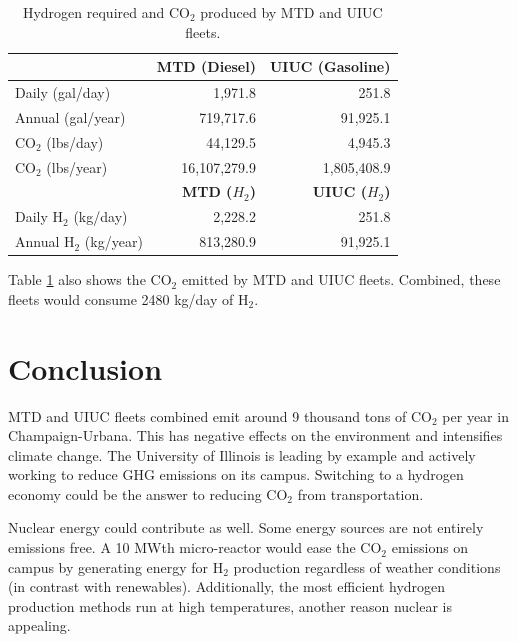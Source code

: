\documentclass{anstrans}
\begin{document}
\begin{table}[H]
	\centering
    \caption{Hydrogen required and CO$_2$ produced by \gls{MTD} and \gls{UIUC} fleets.}
    \label{tab:h2req}
\begin{tabular}{l|rr}
\hline
                   & \textbf{MTD (Diesel)}   & \textbf{UIUC (Gasoline)}  \\ \hline
                   Daily (gal/day)    & 1,971.8        & 251.8            \\
                   Annual (gal/year)    & 719,717.6      & 91,925.1         \\ 
                CO$_2$ (lbs/day)   & 44,129.5       & 4,945.3          \\
                CO$_2$ (lbs/year)  & 16,107,279.9   & 1,805,408.9      \\ \hline
                   & \textbf{MTD ($H_2$)}   & \textbf{UIUC ($H_2$)}  \\ \hline
                Daily H$_2$ (kg/day)    & 2,228.2        & 251.8            \\
                Annual H$_2$ (kg/year)   & 813,280.9      & 91,925.1         \\\hline
\end{tabular}
\end{table}

Table \ref{tab:h2req} also shows the CO$_2$ emitted by \gls{MTD} and UIUC fleets.
Combined, these fleets would consume 2480 kg/day of H$_2$. 

\section{Conclusion}

\gls{MTD} and \gls{UIUC} fleets combined emit around 9 thousand tons of CO$_2$ per year in Champaign-Urbana. This has negative effects on the environment and intensifies climate change. The University of Illinois is leading by example and actively working to reduce \gls{GHG} emissions on its campus. Switching to a hydrogen economy could be the answer to reducing CO$_2$ from transportation.

Nuclear energy could contribute as well. Some energy sources are not entirely emissions free. A 10 MWth micro-reactor would ease the CO$_2$ emissions on campus by generating energy for H$_2$ production regardless of weather conditions (in contrast with renewables). Additionally, the most efficient hydrogen production methods run at high temperatures, another reason nuclear is appealing.
\end{document}
